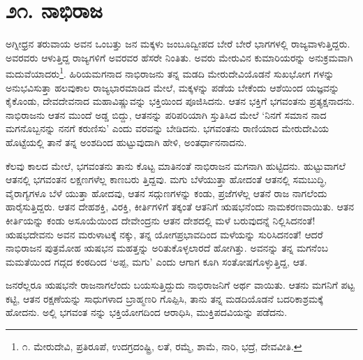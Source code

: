 
\chapter{೨೧. ನಾಭಿರಾಜ}

ಅಗ್ನೀಧ್ರನ ತರುವಾಯ ಅವನ ಒಂಬತ್ತು ಜನ ಮಕ್ಕಳು ಜಂಬೂದ್ವೀಪದ ಬೇರೆ ಬೇರೆ ಭಾಗಗಳಲ್ಲಿ ರಾಜ್ಯವಾಳುತ್ತಿದ್ದರು. ಅವರವರು ಆಳುತ್ತಿದ್ದ ರಾಜ್ಯಗಳಿಗೆ ಅವರವರ ಹೆಸರೇ ನಿಂತಿತು. ಅವರು ಮೇರುವಿನ ಕುಮಾರಿಯರನ್ನು ಅನುಕ್ರಮವಾಗಿ ಮದುವೆಯಾದರು\footnote{೧. ಮೇರುದೇವಿ, ಪ್ರತಿರೂಪೆ, ಉದಗ್ರದಂಷ್ಟ್ರಿ, ಲತೆ, ರಮ್ಮೆ, ಶಾಮೆ, ನಾರಿ, ಭದ್ರೆ, ದೇವವೀತಿ.}. ಹಿರಿಯಮಗನಾದ ನಾಭಿರಾಜನು ತನ್ನ ಮಡದಿ ಮೇರುದೇವಿಯೊಡನೆ ಸುಖಭೋಗ ಗಳನ್ನು ಅನುಭವಿಸುತ್ತಾ ಹಲವುಕಾಲ ರಾಜ್ಯಭಾರಮಾಡಿದ ಮೇಲೆ, ಮಕ್ಕಳನ್ನು ಪಡೆಯ ಬೇಕೆಂದು ಆಶೆಯಿಂದ ಯಜ್ಞವನ್ನು ಕೈಕೊಂಡು, ದೇವದೇವನಾದ ಮಹಾವಿಷ್ಣುವನ್ನು ಭಕ್ತಿಯಿಂದ ಪೂಜಿಸಿದನು. ಆತನ ಭಕ್ತಿಗೆ ಭಗವಂತನು ಪ್ರತ್ಯಕ್ಷನಾದನು. ನಾಭಿರಾಜನು ಆತನ ಮುಂದೆ ಅಡ್ಡ ಬಿದ್ದು, ಆತನನ್ನು ಪರಿಪರಿಯಾಗಿ ಸ್ತುತಿಸಿದ ಮೇಲೆ ‘ನಿನಗೆ ಸಮಾನ ನಾದ ಮಗನೊಬ್ಬನನ್ನು ನನಗೆ ಕರುಣಿಸು’ ಎಂದು ವರವನ್ನು ಬೇಡಿದನು. ಭಗವಂತನು ರಾಣಿಯಾದ ಮೇರುದೇವಿಯ ಹೊಟ್ಟೆಯಲ್ಲಿ ತಾನೆ ತನ್ನ ಅಂಶದಿಂದ ಹುಟ್ಟುವುದಾಗಿ ಹೇಳಿ, ಅಂತರ್ಧಾನನಾದನು.

ಕೆಲವು ಕಾಲದ ಮೇಲೆ, ಭಗವಂತನು ತಾನು ಕೊಟ್ಟ ಮಾತಿನಂತೆ ನಾಭಿರಾಜನ ಮಗನಾಗಿ ಹುಟ್ಟಿದನು. ಹುಟ್ಟುವಾಗಲೆ ಆತನಲ್ಲಿ ಭಗವಂತನ ಲಕ್ಷಣಗಳೆಲ್ಲ ಕಾಣಬರು ತ್ತಿದ್ದವು. ಮಗು ಬೆಳೆಯುತ್ತಾ ಹೋದಂತೆ ಆತನಲ್ಲಿ ಸಮಬುದ್ಧಿ, ವೈರಾಗ್ಯಗಳೂ ಬೆಳೆ ಯುತ್ತಾ ಹೋದವು, ಆತನ ಸದ್ಗುಣಗಳನ್ನು ಕಂಡು, ಪ್ರಜೆಗಳೆಲ್ಲ ಆತನೆ ರಾಜ ನಾಗಲೆಂದು ಹಾರೈಸುತ್ತಿದ್ದರು. ಆತನ ದೇಹಶಕ್ತಿ, ವಿರಕ್ತಿ, ಕೀರ್ತಿಗಳಿಗೆ ತಕ್ಕಂತೆ ಆತನಿಗೆ ಋಷಭನೆಂದು ನಾಮಕರಣವಾಯಿತು. ಆತನ ಕೀರ್ತಿಯನ್ನು ಕಂಡು ಅಸೂಯೆಯಿಂದ ದೇವೇಂದ್ರನು ಆತನ ದೇಶದಲ್ಲಿ ಮಳೆ ಬರುವುದನ್ನೆ ನಿಲ್ಲಿಸಿದನಂತೆ! ಋಷಭದೇವನು ಅವನ ಮರುಳಾಟಕ್ಕೆ ನಕ್ಕು, ತನ್ನ ಯೋಗಪ್ರಭಾವದಿಂದ ಮಳೆಯನ್ನು ಸುರಿಸಿದನಂತೆ! ಆದರೆ ನಾಭಿರಾಜನ ಪುತ್ರಮೋಹ ಋಷಭನ ಮಹತ್ತನ್ನು ಅರಿತುಕೊಳ್ಳಲಾರದೆ ಹೋಗಿತ್ತು. ಅವನನ್ನು ತನ್ನ ಮಗನೆಂಬ ಮಮತೆಯಿಂದ ಗದ್ಗದ ಕಂಠದಿಂದ ‘ಅಪ್ಪ, ಮಗು’ ಎಂದು ಆಗಾಗ ಕೂಗಿ ಸಂತೋಷಗೊಳ್ಳುತ್ತಿದ್ದ, ಆತ.

ಜನರೆಲ್ಲರೂ ಋಷಭನೇ ರಾಜನಾಗಲೆಂದು ಬಯಸುತ್ತಿದ್ದುದು ನಾಭಿರಾಜನಿಗೆ ಅರ್ಥ ವಾಯಿತು. ಆತನು ಮಗನಿಗೆ ಪಟ್ಟ ಕಟ್ಟಿ, ಆತನ ರಕ್ಷಣೆಯನ್ನು ಸಾಧುಗಳಾದ ಬ್ರಾಹ್ಮಣರಿ ಗೊಪ್ಪಿಸಿ, ತಾನು ತನ್ನ ಮಡದಿಯೊಡನೆ ಬದರಿಕಾಶ್ರಮಕ್ಕೆ ಹೋದನು. ಅಲ್ಲಿ ಭಗವಂತ ನನ್ನು ಭಕ್ತಿಯೋಗದಿಂದ ಆರಾಧಿಸಿ, ಮುಕ್ತಿಪದವಿಯನ್ನು ಪಡೆದನು.

